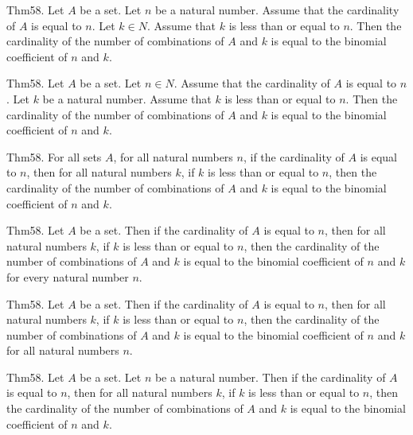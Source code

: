 \documentclass{article}
\begin{document}
Thm58. Let $A$ be a set. Let $n$ be a natural number. Assume that the cardinality of $A$ is equal to $n$. Let $k \in N$. Assume that $k$ is less than or equal to $n$. Then the cardinality of the number of combinations of $A$ and $k$ is equal to the binomial coefficient of $n$ and $k$.

Thm58. Let $A$ be a set. Let $n \in N$. Assume that the cardinality of $A$ is equal to $n$. Let $k$ be a natural number. Assume that $k$ is less than or equal to $n$. Then the cardinality of the number of combinations of $A$ and $k$ is equal to the binomial coefficient of $n$ and $k$.

Thm58. For all sets $A$, for all natural numbers $n$, if the cardinality of $A$ is equal to $n$, then for all natural numbers $k$, if $k$ is less than or equal to $n$, then the cardinality of the number of combinations of $A$ and $k$ is equal to the binomial coefficient of $n$ and $k$.

Thm58. Let $A$ be a set. Then if the cardinality of $A$ is equal to $n$, then for all natural numbers $k$, if $k$ is less than or equal to $n$, then the cardinality of the number of combinations of $A$ and $k$ is equal to the binomial coefficient of $n$ and $k$ for every natural number $n$.

Thm58. Let $A$ be a set. Then if the cardinality of $A$ is equal to $n$, then for all natural numbers $k$, if $k$ is less than or equal to $n$, then the cardinality of the number of combinations of $A$ and $k$ is equal to the binomial coefficient of $n$ and $k$ for all natural numbers $n$.

Thm58. Let $A$ be a set. Let $n$ be a natural number. Then if the cardinality of $A$ is equal to $n$, then for all natural numbers $k$, if $k$ is less than or equal to $n$, then the cardinality of the number of combinations of $A$ and $k$ is equal to the binomial coefficient of $n$ and $k$.
\end{document}
